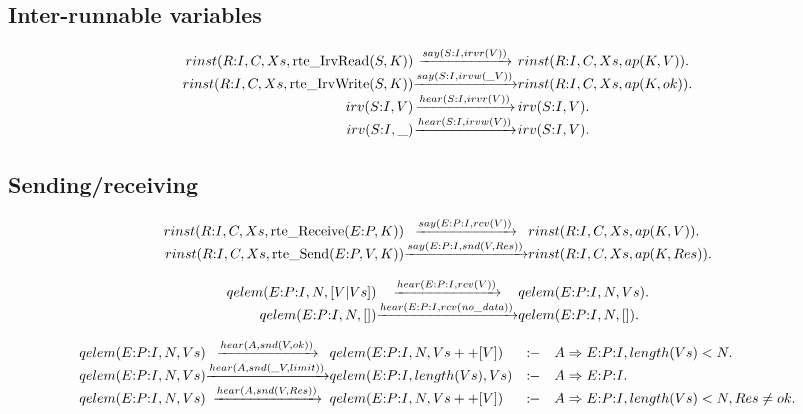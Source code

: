 \subsection{Inter-runnable variables}

\[
\begin{array}{r@{}c@{}l}
  \Preduce{rinst(R{:}I, C, Xs, \rte{IrvRead}(S,K))} {say(S{:}I,irvr(V))}  {rinst(R{:}I, C, Xs, ap(K,V))}  .
\\\Preduce{rinst(R{:}I, C, Xs, \rte{IrvWrite}(S,K))}{say(S{:}I,irvw(\_V))}{rinst(R{:}I, C, Xs, ap(K,ok))} .
\\\Preduce{irv(S{:}I, V)}                           {hear(S{:}I,irvr(V))} {irv(S{:}I, V)}                 .
\\\Preduce{irv(S{:}I,\_)}                           {hear(S{:}I,irvw(V))} {irv(S{:}I, V)}                 .
\end{array}
\]


\subsection{Sending/receiving}

\[
\begin{array}{r@{}c@{}l}
  \Preduce{rinst(R{:}I, C, Xs, \rte{Receive}(E{:}P,K))}{say(E{:}P{:}I,rcv(V))}    {rinst(R{:}I, C, Xs, ap(K,V))} .
\\\Preduce{rinst(R{:}I, C, Xs, \rte{Send}(E{:}P,V,K))} {say(E{:}P{:}I,snd(V,Res))}{rinst(R{:}I, C, Xs, ap(K,Res))}.
\end{array}
\]

\newcommand{\nodata}{\ensuremath{\mathit{no\_data}}}
\[
\begin{array}{r@{}c@{}l}
  \Preduce{qelem(E{:}P{:}I, N, [V|Vs])}{hear(E{:}P{:}I,rcv(V))}      {qelem(E{:}P{:}I, N, Vs)}    .
\\\Preduce{qelem(E{:}P{:}I, N, [])}    {hear(E{:}P{:}I,rcv(\nodata))}{qelem(E{:}P{:}I, N, [])}    .
\end{array}
\]


\[
\begin{array}{r@{}c@{}lcl}
  \Preduce{qelem(E{:}P{:}I, N, Vs)}{hear(A,snd(V,ok))}{qelem(E{:}P{:}I, N, Vs++[V])}
    &\Pif &   A\Rightarrow{}E{:}P{:}I, length(Vs) < N.
\\\Preduce{qelem(E{:}P{:}I, N, Vs)}{hear(A,snd(\_V,limit))}{qelem(E{:}P{:}I, length(Vs), Vs)}
    &\Pif &   A\Rightarrow{}E{:}P{:}I    .
\\\Preduce{qelem(E{:}P{:}I, N, Vs)}{hear(A,snd(V,Res))}{qelem(E{:}P{:}I, N, Vs++[V])}
    &\Pif &   A\Rightarrow{}E{:}P{:}I, length(Vs) < N, Res \neq ok    .
\end{array}
\]

